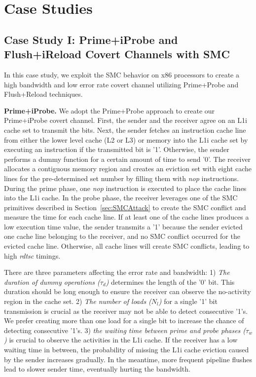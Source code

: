 \section{Case Studies }\label{sec:casestudies}
\subsection{Case Study I: Prime+iProbe and Flush+iReload Covert Channels with SMC}\label{subsec:case1}

In this case study, we exploit the SMC behavior on x86 processors to create a high bandwidth and low error rate covert channel utilizing Prime+Probe and Flush+Reload techniques. 

\noindent\textbf{Prime+iProbe.} We adopt the Prime+Probe approach to create our Prime+iProbe covert channel. First, the sender and the receiver agree on an L1i cache set to transmit the bits. Next, the sender fetches an instruction cache line from either the lower level cache (L2 or L3) or memory into the L1i cache set by executing an instruction if the transmitted bit is '1'. Otherwise, the sender performs a dummy function for a certain amount of time to send '0'. The receiver allocates a contiguous memory region and creates an eviction set with eight cache lines for the pre-determined set number by filling them with \textit{nop} instructions. During the prime phase, one \textit{nop} instruction is executed to place the cache lines into the L1i cache. In the probe phase, the receiver leverages one of the SMC primitives described in Section~\ref{sec:SMCAttack} to create the SMC conflict and measure the time for each cache line. If at least one of the cache lines produces a low execution time value, the sender transmits a '1' because the sender evicted one cache line belonging to the receiver, and no SMC conflict occurred for the evicted cache line. Otherwise, all cache lines will create SMC conflicts, leading to high \textit{rdtsc} timings. 

There are three parameters affecting the error rate and bandwidth: 1) \textit{The duration of dummy operations ($\tau_{d}$)} determines the length of the '0' bit. This duration should be long enough to ensure the receiver can observe the no-activity region in the cache set. 2) \textit{The number of loads ($N_l$)} for a single '1' bit transmission is crucial as the receiver may not be able to detect consecutive '1's. We prefer creating more than one load for a single bit to increase the chance of detecting consecutive '1's. 3) \textit{the waiting time between prime and probe phases ($\tau_{w}$)} is crucial to observe the activities in the L1i cache. If the receiver has a low waiting time in between, the probability of missing the L1i cache eviction caused by the sender increases gradually. In the meantime, more frequent pipeline flushes lead to slower sender time, eventually hurting the bandwidth. 

